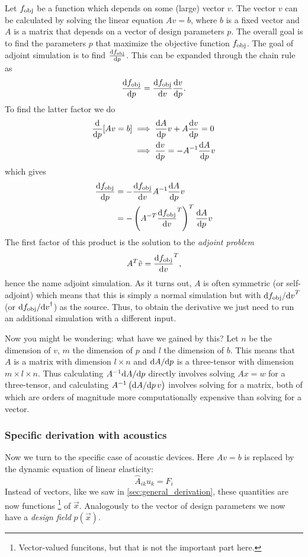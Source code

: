 Let $f_\text{obj}$ be a function which depends on some (large) vector $v$.
The vector $v$ can be calculated by solving the linear equation
$A v = b$, where $b$ is a fixed vector and $A$ is a matrix that depends on a
vector of design parameters $p$.
The overall goal is to find the parameters $p$ that maximize the objective
function $f_\text{obj}$.
The goal of adjoint simulation is to find $\diff{\fobj}{p}$.
This can be expanded through the chain rule as
\[
	\diff{\fobj}{p} = \diff{\fobj}{v} \diff{v}{p}.
\]
To find the latter factor we do
\begin{align*}
	\diff{}{p} [Av = b] &\implies \diff{A}{p} v + A \diff{v}{p} = 0\\
						&\implies \diff{v}{p} = -A^{-1} \diff{A}{p} v
\end{align*}
which gives
\begin{align}
	\diff{\fobj}{p} &= - \diff{\fobj}{v} A^{-1} \diff{A}{p}
	v\label{eq:no_adj_sim}\\
	&= - \left(A^{-T} \diff{\fobj}{v}^T \right)^T \diff{A}{p} v
\end{align}
The first factor of this product is the solution to the \emph{adjoint problem}
\begin{equation}
	A^T \tilde v = \diff{\fobj}{v}^T,
\end{equation}
hence the name adjoint simulation.
As it turns out, $A$ is often symmetric (or self-adjoint) which means that this is simply a normal
simulation but with $\difs{\fobj}{v}^T$ (or $\difs{\fobj}{v}^\dagger$) as the source.
Thus, to obtain the derivative we just need to run an additional
simulation with a different input.

Now you might be wondering: what have we gained by this?
Let $n$ be the dimension of $v$, $m$ the dimension of $p$ and $l$ the dimension
of $b$.
This means that $A$ is a matrix with dimension $l\times n$ and $\difs{A}{p}$ is
a three-tensor with dimension $m\times l\times n$.
Thus calculating $A^{-1} \difs{A}{p}$ directly involves solving $Ax = w$ for a
three-tensor, and calculating $A^{-1} \left(\difs{A}{p}\,v\right)$
involves solving for a matrix, both of which are orders of magnitude more
computationally expensive than solving for a vector.

\subsubsection{Specific derivation with acoustics}\label{sec:spec_der}

Now we turn to the specific case of acoustic devices.
Here $A v = b$ is replaced by the dynamic equation  of linear elasticity:
\begin{equation}\label{eq:sim_eq}
	\hat A_{ik} u_k = F_i
\end{equation}
Instead of vectors, like we saw in \cref{sec:general_derivation}, these quantities are now functions%
\footnote{%
	Vector-valued funcitons, but that is not the important part here.
}
of $\vec x$.
Analogously to the vector of design parameters we now have a \emph{design field}
$p(\vec x)$.

